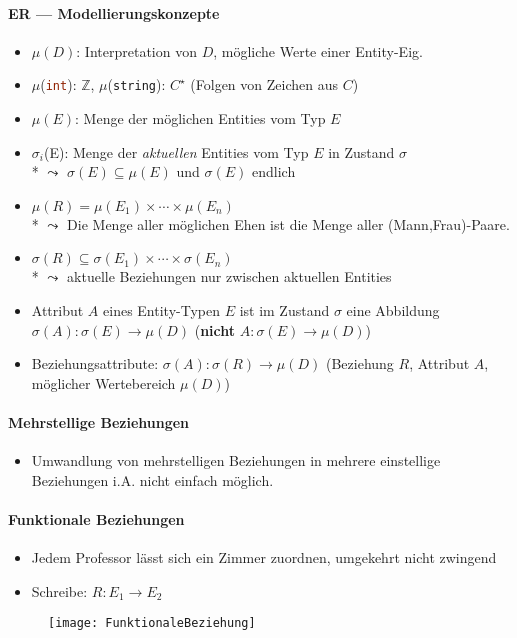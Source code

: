 \paragraph{ER --- Modellierungskonzepte}
\begin{itemize}
	\item \( \mu(D) \): Interpretation von \( D \), mögliche Werte einer Entity-Eig.
	\item \( \mu \)(\lstinline[language=sql]{int}): \( \mathbb{Z} \),  \( \mu \)(\lstinline[language=sql]{string}): \( C^\star \) (Folgen von Zeichen aus \( C \))
	\item \( \mu(E) \): Menge der möglichen Entities vom Typ \( E \)
	\item \( \sigma_i \)(E): Menge der \emph{aktuellen} Entities vom Typ \( E \) in Zustand \( \sigma\)
	\\* \( \leadsto \) \( \sigma(E) \subseteq \mu(E) \) und \( \sigma(E) \) endlich
	\item \( \mu(R) = \mu(E_1) \times \cdots \times \mu(E_n) \) \\* \( \leadsto \) Die Menge aller möglichen Ehen ist die Menge aller (Mann,Frau)-Paare.
	\item \( \sigma(R) \subseteq \sigma(E_1) \times \cdots \times \sigma(E_n) \) \\* \( \leadsto \) aktuelle Beziehungen nur zwischen aktuellen Entities
	\item Attribut \( A \) eines Entity-Typen \( E \) ist im Zustand \( \sigma \) eine Abbildung \( \sigma(A): \sigma(E) \to \mu(D) \) (\textbf{nicht} \( A: \sigma(E) \to \mu(D) \))
	\item Beziehungsattribute: \( \sigma(A): \sigma(R) \to \mu(D) \) (Beziehung \( R \), Attribut \( A \), möglicher Wertebereich \( \mu(D) \))
\end{itemize}

\paragraph{Mehrstellige Beziehungen}
\begin{itemize}
	\item Umwandlung von mehrstelligen Beziehungen in mehrere einstellige Beziehungen i.A. nicht einfach möglich.
\end{itemize}

\paragraph{Funktionale Beziehungen}
\begin{itemize}
	\item Jedem Professor lässt sich ein Zimmer zuordnen, umgekehrt nicht zwingend
	\item Schreibe: \( R: E_1 \to E_2 \)
\end{itemize}
\begin{figure}[H]\centering\label{FunktionaleBeziehung}\texttt{[image: FunktionaleBeziehung]}\end{figure}



